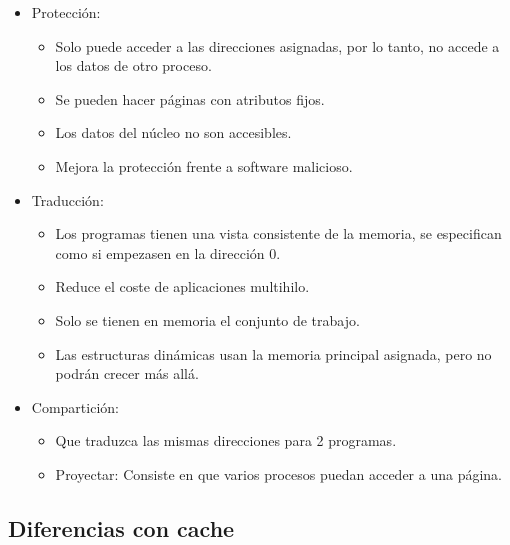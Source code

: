 \documentclass[12pt, twoside, openright]{report} %
\begin{document}
    \begin{itemize}
    
    \item
      Protección:

      \begin{itemize}
      
      \item
        Solo puede acceder a las direcciones asignadas, por lo tanto, no
        accede a los datos de otro proceso.
      \item
        Se pueden hacer páginas con atributos fijos.
      \item
        Los datos del núcleo no son accesibles.
      \item
        Mejora la protección frente a software malicioso.
      \end{itemize}
    \item
      Traducción:

      \begin{itemize}
      
      \item
        Los programas tienen una vista consistente de la memoria, se
        especifican como si empezasen en la dirección 0.
      \item
        Reduce el coste de aplicaciones multihilo.
      \item
        Solo se tienen en memoria el conjunto de trabajo.
      \item
        Las estructuras dinámicas usan la memoria principal asignada,
        pero no podrán crecer más allá.
      \end{itemize}
    \item
      Compartición:

      \begin{itemize}
      
      \item
        Que traduzca las mismas direcciones para 2 programas.
      \item
        Proyectar: Consiste en que varios procesos puedan acceder a una
        página.
      \end{itemize}
    \end{itemize}
  \subsection{Diferencias con cache}
\end{document}
